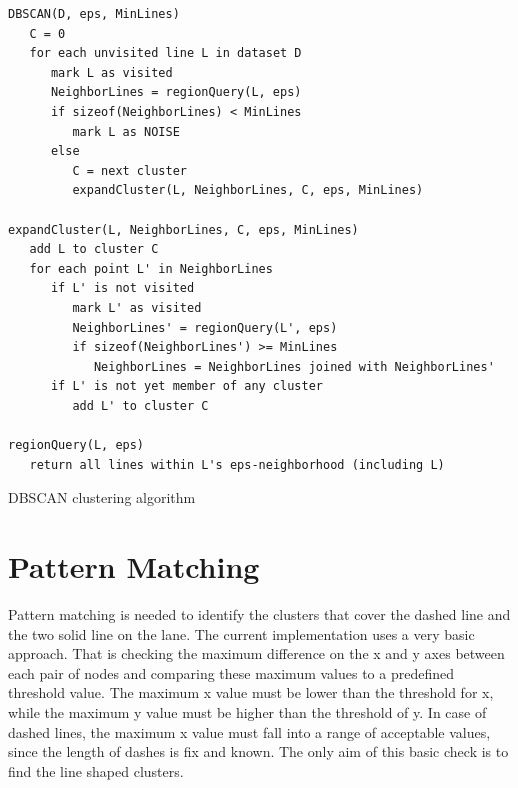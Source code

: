 \documentclass[Report.tex]{subfiles}
\begin{document}
\begin{code}[hp]
\large
\begin{verbatim}
DBSCAN(D, eps, MinLines)
   C = 0
   for each unvisited line L in dataset D
      mark L as visited
      NeighborLines = regionQuery(L, eps)
      if sizeof(NeighborLines) < MinLines
         mark L as NOISE
      else
         C = next cluster
         expandCluster(L, NeighborLines, C, eps, MinLines)

expandCluster(L, NeighborLines, C, eps, MinLines)
   add L to cluster C
   for each point L' in NeighborLines
      if L' is not visited
         mark L' as visited
         NeighborLines' = regionQuery(L', eps)
         if sizeof(NeighborLines') >= MinLines
            NeighborLines = NeighborLines joined with NeighborLines'
      if L' is not yet member of any cluster
         add L' to cluster C

regionQuery(L, eps)
   return all lines within L's eps-neighborhood (including L)
\end{verbatim}

\caption{DBSCAN clustering algorithm}
\label{pseudo:dbscan}
\end{code}

\section{Pattern Matching} %
\label{sec:Pattern Matching on Clusers}
Pattern matching is needed to identify the clusters that cover the dashed line
and the two solid line on the lane. The current implementation uses a very
basic approach. That is checking the maximum difference on the x and y axes
between each pair of nodes and comparing these maximum values to a predefined
threshold value. The maximum x value must be lower than the threshold for x,
while the maximum y value must be higher than the threshold of y. In case of
dashed lines, the maximum x value must fall into a range of acceptable values,
since the length of dashes is fix and known. The only aim of this basic check
is to find the line shaped clusters.
\end{document}
